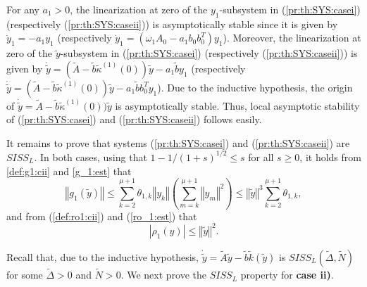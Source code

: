 \documentclass[letterpaper, 10pt]{article}
\newcommand{\rref}[1]{(\ref{#1})}
\newcommand{\norme}[1]{\left\Vert #1\right\Vert}
\newcommand{\abs}[1]{\left| #1 \right|}
\begin{document}
For any $a_1>0$, the linearization at zero of the $y_1$-subsystem in \rref{pr:th:SYS:casei} (respectively  \rref{pr:th:SYS:caseii}) is asymptotically stable since it is given by $\dot{y}_1 = - a_1 y_1$ (respectively $\dot{y}_1 = (\omega_1 A_0 - a_1 b_0 b_0^T ) y_1$). Moreover, the linearization at zero of the $\tilde{y}$-subsystem in \rref{pr:th:SYS:casei} (respectively  \rref{pr:th:SYS:caseii}) is given by $\dot{\tilde{y}}= ( \tilde{A}-\tilde{b}\tilde{\kappa}^{(1)}(0)) \tilde{y} - a_1 \tilde{b} y_1  $ (respectively $\dot{\tilde{y}}=  (\tilde{A}-\tilde{b}\tilde{\kappa}^{(1)}(0)) \tilde{y} -  a_1 \tilde{b} b_0^T y_1$). Due to the inductive hypothesis, the origin of $\dot{\tilde{y}}=  \tilde{A}-\tilde{b}\tilde{\kappa}^{(1)}(0)) \tilde{y}$ is asymptotically stable. Thus, local asymptotic stability of \rref{pr:th:SYS:casei} and  \rref{pr:th:SYS:caseii} follows easily.






It remains to prove that systems \rref{pr:th:SYS:casei} and \rref{pr:th:SYS:caseii} are $SISS_L$. In both cases, using that $1-1/(1+s)^{1/2} \leq s$ for all $s \geq 0$, it holds from \eqref{def:g1:cii} and \eqref{g_1:est} that
\begin{equation}
\label{SISS:est:G(y)}
\norme{g_1(\tilde{y})} \leq \sum\limits_{k=2}^{\mu +1} \theta_{1,k} \norme{y_k} \left(   \sum\limits_{m=k}^{\mu +1} \norme{y_m}^2   \right) \leq  \norme{\tilde{y}}^3 \sum\limits_{k=2}^{\mu +1} \theta_{1,k} ,
\end{equation} and from \rref{def:ro1:cii} and \rref{ro_1:est} that
\begin{equation}
\label{SISS:est:ro(y)}
\abs{\rho_1(y)} \leq \norme{\tilde{y}}^2.
\end{equation}



Recall that, due to the inductive hypothesis, $  \dot{\tilde{y}}  = \tilde{A} \tilde{y}  - \tilde{b}  \tilde{k} (\tilde{y})$ is $SISS_L(\tilde{\Delta} , \tilde{N})$ for some $\tilde{\Delta}>0 $ and $\tilde{N}>0$. We next prove the $SISS_L $ property for {\bf case ii)}.
\end{document}
